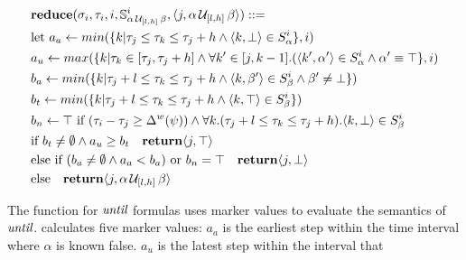 \begin{small}
\begin{align*}
&\mathbf{reduce}(\sigma_i,\tau_i, i,\mathbb{S}^i_{\alpha\, \mathcal{U}_{[l,h]}\, \beta} ,\langle j, \alpha\, \mathcal{U}_{[l,h]}\, \beta \rangle) ::=\\
&\text{let } a_a \leftarrow min(\{k | \tau_j \leq \tau_k \leq \tau_j+h  \wedge \langle k, \bot \rangle \in S^i_\alpha \},i) \\
 &a_u \leftarrow max(\{k| \tau_k \in [\tau_j,\tau_j+h]
 \wedge \forall k' \in [j,k-1].(\langle k', \alpha' \rangle \in S^i_\alpha \wedge \alpha' \equiv \top\},i) \\
 &b_a \leftarrow min(\{k | \tau_j+l \leq \tau_k \leq \tau_j+h \wedge \langle k, \beta' \rangle \in S^i_\beta \wedge \beta' \neq \bot\}) \\
&b_t \leftarrow min(\{k | \tau_j+l \leq \tau_k \leq \tau_j+h \wedge \langle k, \top \rangle \in S^i_{\beta} \}) \\
&b_n \leftarrow \top \text{ if } (\tau_i - \tau_j \geq \Delta^w(\psi))
 \wedge \forall k.(\tau_j+l \leq \tau_k \leq \tau_j+h). \langle k, \bot \rangle \in S^i_{\beta} \\
&\text{if } b_t \neq \emptyset \wedge a_u \geq b_t
 \quad\mathbf{return}
 \langle j, \top \rangle \\
&\text{else if } (b_a \neq \emptyset \wedge a_a < b_a) \text{ or } b_n = \top
\quad
\mathbf{return} \langle j, \bot \rangle \\
&\text{else}
 \quad\mathbf{return} \langle j, \alpha\, \mathcal{U}_{[l,h]}\, \beta \rangle
 \end{align*}
\end{small}
%
The \reduce function for $\emph{until}$ formulas uses marker values to evaluate the semantics of $\emph{until}$.
\reduce calculates five marker values: $a_a$ is the earliest step within the time
interval where $\alpha$ is known false. $a_u$ is the latest step within the interval that
